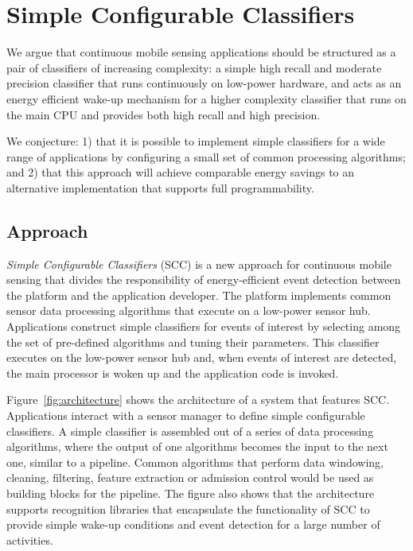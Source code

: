 \section{Simple Configurable Classifiers}
\label{sec:conjecture}

We argue that continuous mobile sensing applications should be
structured as a pair of classifiers of increasing complexity: a simple
high recall and moderate precision classifier that runs continuously
on low-power hardware, and acts as an energy efficient wake-up
mechanism for a higher complexity classifier that runs on the main CPU
and provides both high recall and high precision.

We conjecture: 1) that it is possible to implement simple classifiers for a 
wide range of applications by configuring a small set of common processing 
algorithms; and  2) that this approach will achieve comparable energy 
savings to an alternative implementation that supports full programmability.

\subsection {Approach}

{\em Simple Configurable Classifiers} (SCC) is a new approach for
continuous mobile sensing that divides the responsibility of
energy-efficient event detection between the platform and
the application developer.  The platform implements common sensor data
processing algorithms that execute on a low-power sensor hub.
Applications construct simple classifiers for events of interest by
selecting among the set of pre-defined 
algorithms and tuning their parameters.  This classifier executes on
the low-power sensor hub and, when events of interest are detected,
the main processor is woken up and the application code is invoked.
  
Figure~\ref{fig:architecture} shows the architecture of a
system that features SCC. Applications interact with a sensor 
manager to define simple configurable classifiers. A simple 
classifier is assembled out of a series of data processing
algorithms, where the output of one algorithms becomes the input to
the next one, similar to a pipeline.  Common algorithms
that perform data windowing, cleaning, filtering, feature extraction 
or admission control would be used as building blocks for the 
pipeline.  The figure also
shows that the architecture supports recognition libraries that
encapsulate the functionality of SCC to provide simple
wake-up conditions and event detection for a large number of activities. 

